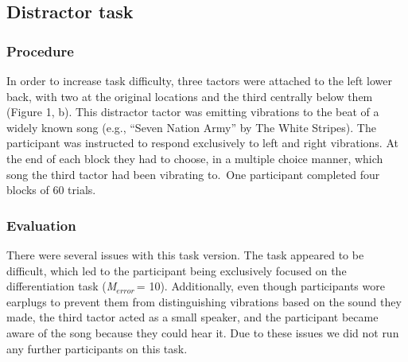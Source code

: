 \documentclass[twocolumn, serif, authordate, review]{jote-article}
\begin{document}
{}
\subsection*{Distractor task}
\gotoreview
\label{sec:distractor}
\subsubsection*{Procedure}In order to increase task difficulty,\textbf{ }three tactors were attached to the left lower back, with two at the original locations and the third centrally below them (Figure 1, b).\textbf{ }This distractor tactor was emitting vibrations to the beat of a widely known song (e.g., ``Seven Nation Army'' by The White Stripes). The participant was instructed to respond exclusively to left and right vibrations. At the end of each block they had to choose, in a multiple choice manner, which song the third tactor had been vibrating to.~One participant completed four blocks of 60 trials.~

\subsubsection*{Evaluation}There were several issues with this task version. The task appeared to be difficult, which led to the participant being exclusively focused on the differentiation task (\textit{M${}_{error\ }$}= 10). Additionally, even though participants wore earplugs to prevent them from distinguishing vibrations based on the sound they made, the third tactor acted as a small speaker, and the participant became aware of the song because they could hear it. Due to these issues we did not run any further participants on this task.

{} 
\end{document}
